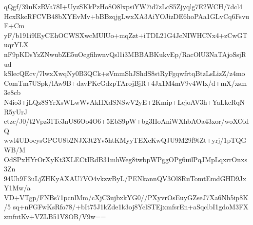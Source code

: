 qQgf/39uKzRVa78I+UyzSKkPzHo8O8lxpsiYW7id7zLcS5Zjyqlg7E2WCH/7dcl4
HcxRkcRFCVB48bXYEvMv+bBBzqjgLwxXA3AiYOJizDE6hoPAa1GLvCq6FsvuE+Cm
yF/b191i9lEyCEhOCWSXwcMUlUo+mqZzt+iTDL21G4JcNIWHCNx4+zCwGTuqrYLX
nF9pKDsYzZNwubZE5uOcgfihwnvQsl1i3MBBABKukvEp/RacOlU3NaTAjoSsjRud
kSlecQEcv/7lwxXwqNy0B3QCk+sVmmShJShdS8stRyFgqwfrtqBtzLsLizZ/z4mo
ComTm7USpk/lAw9B+davPKcGdzpTArojBjR+4Jx1M4mV9v4Wlx/d+mX/xsm3e8cb
N4io3+jLQz8SYrXsWLwWvAkHXdSNSwV2yE+2Kmip+LcjoAV3h+YaLkcRqNR5yUrJ
ctze/J0/t2Vpz31Te3nU86Oo4O6+5EbS9pW+bg3HoAniWXhbAOa43xor/woXOldQ
wwl4UDocysGPGU8b2NJX3t2Yv5htKMyyTEXcKwQJU9M29f9tZt+yrj/1pTQGWB/M
OdSPxHYrOrXyKt3XLECtIRdB31mhWeg8twbpWPggOPg6uilPqJMpLqxrrOnxs3Zn
94Uh9F3uLjZHKyAXAU7VO4vkzwByL/PENkannQV3Ol8RuTomtEmdGHD9JxY1Mw/a
VD+VTgp/FNBs71pcnlMm/cXjC3ujbxkYG0//PXyvrOsEuyGZseJ7Xa6Nh5ip8K/5
sq+nFGFwKsRfo78/+bIt75J1kZde1k3oj8YclSTEjxmfsrEn+aSqclbI1gdoM3FX
zmfntKv+VZLB51V8OB/V9w==

